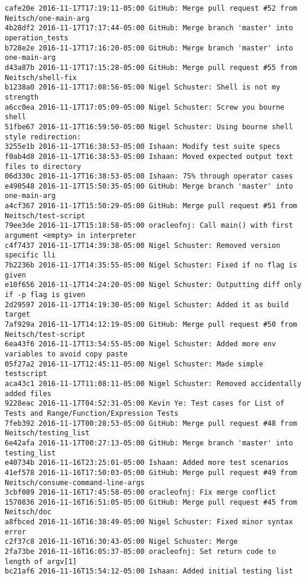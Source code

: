 \begin{lstlisting}
cafe20e 2016-11-17T17:19:11-05:00 GitHub: Merge pull request #52 from Neitsch/one-main-arg
4b28df2 2016-11-17T17:17:44-05:00 GitHub: Merge branch 'master' into operation_tests
b728e2e 2016-11-17T17:16:20-05:00 GitHub: Merge branch 'master' into one-main-arg
d43a87b 2016-11-17T17:15:28-05:00 GitHub: Merge pull request #55 from Neitsch/shell-fix
b1238a0 2016-11-17T17:08:56-05:00 Nigel Schuster: Shell is not my strength
a6cc0ea 2016-11-17T17:05:09-05:00 Nigel Schuster: Screw you bourne shell
51fbe67 2016-11-17T16:59:50-05:00 Nigel Schuster: Using bourne shell style redirection:
3255e1b 2016-11-17T16:38:53-05:00 Ishaan: Modify test suite specs
f0ab4d8 2016-11-17T16:38:53-05:00 Ishaan: Moved expected output text files to directory
06d330c 2016-11-17T16:38:53-05:00 Ishaan: 75% through operator cases
e490548 2016-11-17T15:50:35-05:00 GitHub: Merge branch 'master' into one-main-arg
a4cf367 2016-11-17T15:50:29-05:00 GitHub: Merge pull request #51 from Neitsch/test-script
79ee3de 2016-11-17T15:18:58-05:00 oracleofnj: Call main() with first argument <empty> in interpreter
c4f7437 2016-11-17T14:39:38-05:00 Nigel Schuster: Removed version specific lli
7b2236b 2016-11-17T14:35:55-05:00 Nigel Schuster: Fixed if no flag is given
e10f656 2016-11-17T14:24:20-05:00 Nigel Schuster: Outputting diff only if -p flag is given
2d29597 2016-11-17T14:19:30-05:00 Nigel Schuster: Added it as build target
7af929a 2016-11-17T14:12:19-05:00 GitHub: Merge pull request #50 from Neitsch/test-script
6ea43f6 2016-11-17T13:54:55-05:00 Nigel Schuster: Added more env variables to avoid copy paste
05f27a2 2016-11-17T12:45:11-05:00 Nigel Schuster: Made simple testscript
aca43c1 2016-11-17T11:08:11-05:00 Nigel Schuster: Removed accidentally added files
9228eac 2016-11-17T04:52:31-05:00 Kevin Ye: Test cases for List of Tests and Range/Function/Expression Tests
7feb392 2016-11-17T00:28:53-05:00 GitHub: Merge pull request #48 from Neitsch/testing_list
6e42afa 2016-11-17T00:27:13-05:00 GitHub: Merge branch 'master' into testing_list
e40734b 2016-11-16T23:25:01-05:00 Ishaan: Added more test scenarios
41ef578 2016-11-16T17:50:03-05:00 GitHub: Merge pull request #49 from Neitsch/consume-command-line-args
3cbf089 2016-11-16T17:45:58-05:00 oracleofnj: Fix merge conflict
1570836 2016-11-16T16:51:05-05:00 GitHub: Merge pull request #45 from Neitsch/doc
a8fbced 2016-11-16T16:38:49-05:00 Nigel Schuster: Fixed minor syntax error
c2f37c8 2016-11-16T16:30:43-05:00 Nigel Schuster: Merge
2fa73be 2016-11-16T16:05:37-05:00 oracleofnj: Set return code to length of argv[1]
bc21af6 2016-11-16T15:54:12-05:00 Ishaan: Added initial testing list

\end{lstlisting}
